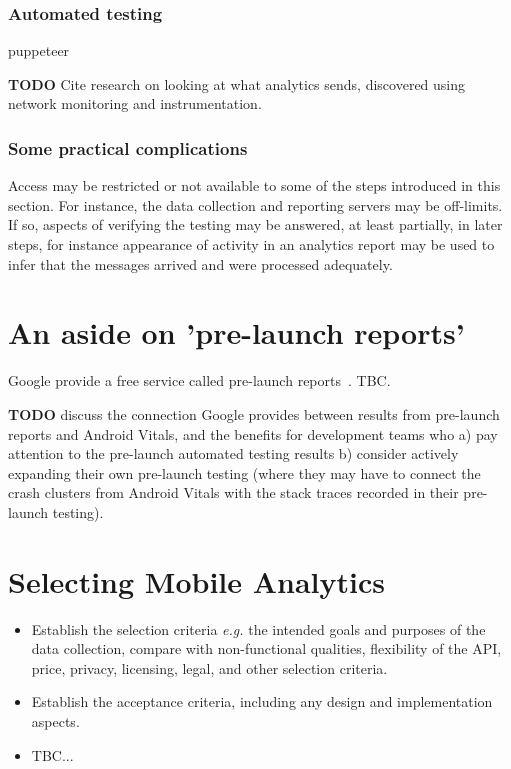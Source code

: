 \subsubsection{Automated testing}
puppeteer~\cite{using_puppeteer_to_automate_your_google_analytics_testing}

\textbf{TODO} Cite research on looking at what analytics sends, discovered using network monitoring and instrumentation. 

\subsubsection{Some practical complications} 
Access may be restricted or not available to some of the steps introduced in this section. For instance, the data collection and reporting servers may be off-limits. If so, aspects of verifying the testing may be answered, at least partially, in later steps, for instance appearance of activity in an analytics report may be used to infer that the messages arrived and were processed adequately.

\section{An aside on 'pre-launch reports'}
Google provide a free service called pre-launch reports~\cite{google_use_pre_launch_reports}. TBC.

\textbf{TODO} discuss the connection Google provides between results from pre-launch reports and Android Vitals, and the benefits for development teams who a) pay attention to the pre-launch automated testing results b) consider actively expanding their own pre-launch testing (where they may have to connect the crash clusters from Android Vitals with the stack traces recorded in their pre-launch testing).

\section{Selecting Mobile Analytics}

\begin{itemize}
    \item Establish the selection criteria \emph{e.g.} the intended goals and purposes of the data collection, compare with non-functional qualities, flexibility of the API, price, privacy, licensing, legal, and other selection criteria.
    \item Establish the acceptance criteria, including any design and implementation aspects.
    \item TBC...
\end{itemize}

